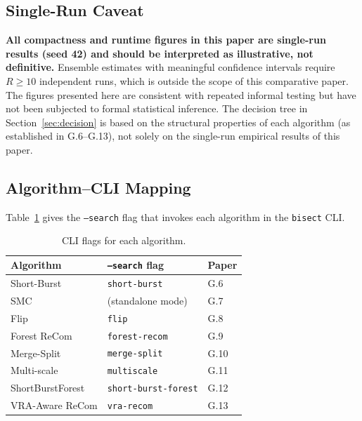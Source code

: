 \subsection{Single-Run Caveat}
\label{sec:caveat}

\textbf{All compactness and runtime figures in this paper are single-run
results (seed 42) and should be interpreted as illustrative, not definitive.}
Ensemble estimates with meaningful confidence intervals require $R \geq 10$
independent runs, which is outside the scope of this comparative paper.
The figures presented here are consistent with repeated informal testing
but have not been subjected to formal statistical inference.
The decision tree in Section~\ref{sec:decision} is based on the
structural properties of each algorithm (as established in G.6--G.13),
not solely on the single-run empirical results of this paper.

\subsection{Algorithm--CLI Mapping}

Table~\ref{tab:cli} gives the \texttt{--search} flag that invokes each
algorithm in the \texttt{bisect} CLI.

\begin{table}[ht]
\centering
\caption{CLI flags for each algorithm.}
\label{tab:cli}
\begin{tabular}{@{}lll@{}}
\toprule
Algorithm & \texttt{--search} flag & Paper \\
\midrule
Short-Burst     & \texttt{short-burst}           & G.6 \\
SMC             & (standalone mode)              & G.7 \\
Flip            & \texttt{flip}                  & G.8 \\
Forest ReCom    & \texttt{forest-recom}          & G.9 \\
Merge-Split     & \texttt{merge-split}           & G.10 \\
Multi-scale     & \texttt{multiscale}            & G.11 \\
ShortBurstForest & \texttt{short-burst-forest}   & G.12 \\
VRA-Aware ReCom & \texttt{vra-recom}             & G.13 \\
\bottomrule
\end{tabular}
\end{table}
